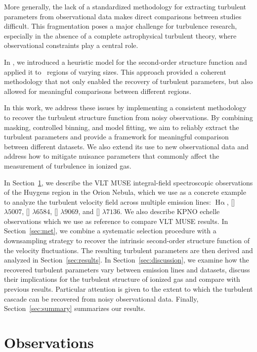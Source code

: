 \documentclass[fleqn,usenatbib, useAMS, a4paper]{mnras}
\newcommand\ha{\ensuremath{\text{H}\upalpha}}
\newcommand\Wav[1]{\ensuremath{\lambda #1}}
\newcommand\ariii{[\ion{Ar}{III}] \Wav{7136}}
\newcommand\hii{\ion{H}{II}}
\newcommand\halpha{\ha}
\newcommand\n{[\ion{N}{II}] \Wav{6584}}
\newcommand\oiii{[\ion{O}{III}] \Wav{5007}}
\newcommand\sii{[\ion{S}{II}] \Wav{6731}}
\newcommand\siii{[\ion{S}{III}] \Wav{9069}}
\begin{document}
More generally, the lack of a standardized methodology for extracting turbulent parameters from observational data makes direct comparisons between studies difficult. 
This fragmentation poses a major challenge for turbulence research, especially in the absence of a complete astrophysical turbulent theory, where observational constraints play a central role.


In \citet{garciav23}, we introduced a heuristic model for the second-order structure function and applied it to \hii\ regions of varying sizes. 
This approach provided a coherent methodology that not only enabled the recovery of turbulent parameters, but also allowed for meaningful comparisons between different regions.

In this work, we address these issues by implementing a consistent methodology to recover the turbulent structure function from noisy observations. 
By combining masking, controlled binning, and model fitting, we aim to reliably extract the turbulent parameters and provide a framework for meaningful comparison between different datasets.
We also extend its use to new observational data and address how to mitigate nuisance parameters that commonly affect the measurement of turbulence in ionized gas.

In Section~\ref{sec:observations}, we describe the VLT MUSE integral-field spectroscopic observations of the Huygens region in the Orion Nebula, which we use as a concrete example to analyze the turbulent velocity field across multiple emission lines: \halpha, \oiii, \n, \siii, and \ariii.
We also describe KPNO echelle observations which we use as reference to compare VLT MUSE results. 
In Section~\ref{sec:met}, we combine a systematic selection procedure with a downsampling strategy to recover the intrinsic second-order structure function of the velocity fluctuations. 
The resulting turbulent parameters are then derived and analyzed in Section~\ref{sec:results}.
In Section~\ref{sec:discussion}, we examine how the recovered turbulent parameters vary between emission lines and datasets, discuss their implications for the turbulent structure of ionized gas and compare with previous results. 
Particular attention is given to the extent to which the turbulent cascade can be recovered from noisy observational data.
Finally, Section~\ref{sec:summary} summarizes our results.


\section{Observations}\label{sec:observations}
\end{document}
